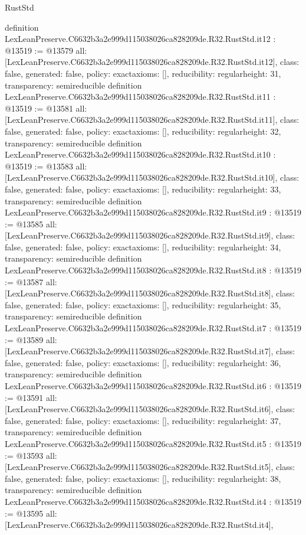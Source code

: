 \begin{lexlean}{RustStd}
\begin{coremodule}
{}
definition LexLeanPreserve.C6632b3a2e999d115038026ca828209de.R32.RustStd.it12 : @13519 := @13579 {
  all: [LexLeanPreserve.C6632b3a2e999d115038026ca828209de.R32.RustStd.it12],
  class: false,
  generated: false,
  policy: exact{axioms: []},
  reducibility: regular{height: 31},
  transparency: semireducible
}
definition LexLeanPreserve.C6632b3a2e999d115038026ca828209de.R32.RustStd.it11 : @13519 := @13581 {
  all: [LexLeanPreserve.C6632b3a2e999d115038026ca828209de.R32.RustStd.it11],
  class: false,
  generated: false,
  policy: exact{axioms: []},
  reducibility: regular{height: 32},
  transparency: semireducible
}
definition LexLeanPreserve.C6632b3a2e999d115038026ca828209de.R32.RustStd.it10 : @13519 := @13583 {
  all: [LexLeanPreserve.C6632b3a2e999d115038026ca828209de.R32.RustStd.it10],
  class: false,
  generated: false,
  policy: exact{axioms: []},
  reducibility: regular{height: 33},
  transparency: semireducible
}
definition LexLeanPreserve.C6632b3a2e999d115038026ca828209de.R32.RustStd.it9 : @13519 := @13585 {
  all: [LexLeanPreserve.C6632b3a2e999d115038026ca828209de.R32.RustStd.it9],
  class: false,
  generated: false,
  policy: exact{axioms: []},
  reducibility: regular{height: 34},
  transparency: semireducible
}
definition LexLeanPreserve.C6632b3a2e999d115038026ca828209de.R32.RustStd.it8 : @13519 := @13587 {
  all: [LexLeanPreserve.C6632b3a2e999d115038026ca828209de.R32.RustStd.it8],
  class: false,
  generated: false,
  policy: exact{axioms: []},
  reducibility: regular{height: 35},
  transparency: semireducible
}
definition LexLeanPreserve.C6632b3a2e999d115038026ca828209de.R32.RustStd.it7 : @13519 := @13589 {
  all: [LexLeanPreserve.C6632b3a2e999d115038026ca828209de.R32.RustStd.it7],
  class: false,
  generated: false,
  policy: exact{axioms: []},
  reducibility: regular{height: 36},
  transparency: semireducible
}
definition LexLeanPreserve.C6632b3a2e999d115038026ca828209de.R32.RustStd.it6 : @13519 := @13591 {
  all: [LexLeanPreserve.C6632b3a2e999d115038026ca828209de.R32.RustStd.it6],
  class: false,
  generated: false,
  policy: exact{axioms: []},
  reducibility: regular{height: 37},
  transparency: semireducible
}
definition LexLeanPreserve.C6632b3a2e999d115038026ca828209de.R32.RustStd.it5 : @13519 := @13593 {
  all: [LexLeanPreserve.C6632b3a2e999d115038026ca828209de.R32.RustStd.it5],
  class: false,
  generated: false,
  policy: exact{axioms: []},
  reducibility: regular{height: 38},
  transparency: semireducible
}
definition LexLeanPreserve.C6632b3a2e999d115038026ca828209de.R32.RustStd.it4 : @13519 := @13595 {
  all: [LexLeanPreserve.C6632b3a2e999d115038026ca828209de.R32.RustStd.it4],
}
\end{coremodule}
\end{lexlean}

